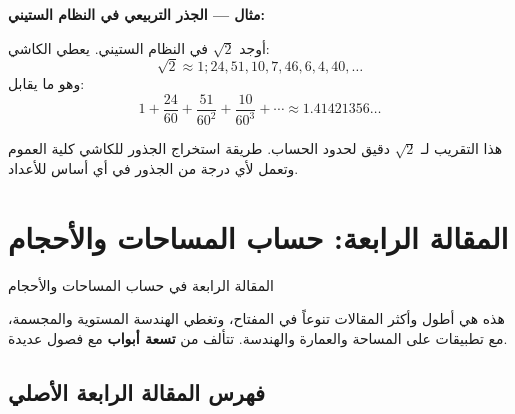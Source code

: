 \documentclass[11pt,a4paper]{book}
\newcommand{\ar}[1]{\arabicfont\beginR #1\endR}
\newcommand{\arHuge}[1]{{\Huge\arabicfont\beginR #1\endR}}
\newenvironment{arabicbox}{%
  \begin{framed}
  \begin{minipage}{\linewidth-2\fboxsep-2\fboxrule}
  \setlength{\parindent}{0pt}
  \linespread{1.3}\selectfont
}{%
  \end{minipage}
  \end{framed}
}
\begin{document}
\vspace{0.3cm}

\noindent\textbf{\ar{مثال — الجذر التربيعي في النظام الستيني:}}

\ar{أوجد} $\sqrt{2}$ \ar{في النظام الستيني. يعطي الكاشي:}
\[
\sqrt{2} \approx 1; 24, 51, 10, 7, 46, 6, 4, 40, \ldots
\]
\ar{وهو ما يقابل:}
\[
1 + \frac{24}{60} + \frac{51}{60^2} + \frac{10}{60^3} + \cdots \approx
1.41421356\ldots
\]

\noindent\ar{هذا التقريب لـ $\sqrt{2}$ دقيق لحدود الحساب. طريقة استخراج الجذور للكاشي كلية العموم وتعمل لأي درجة من الجذور في أي أساس للأعداد.}
\clearpage

\chapter{\ar{المقالة الرابعة: حساب المساحات والأحجام}}
\label{ch:treatise4}

\begin{arabicbox}
\begin{center}
\arHuge{المقالة الرابعة في حساب المساحات والأحجام}
\end{center}
\end{arabicbox}

\vspace{0.5cm}

\noindent\ar{هذه هي أطول وأكثر المقالات تنوعاً في المفتاح، وتغطي الهندسة المستوية والمجسمة، مع تطبيقات على المساحة والعمارة والهندسة. تتألف من \textbf{تسعة أبواب} مع فصول عديدة.}

\section{\ar{فهرس المقالة الرابعة الأصلي}}
\end{document}
